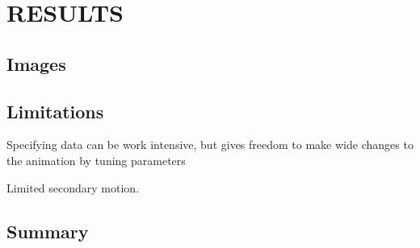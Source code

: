 
 
\chapter{RESULTS}
\label{chapter:results}

\section{Images}
\label{section:image_results}

\section{Limitations}
\label{section:limitations}
Specifying data can be work intensive, but gives freedom to make wide changes to the animation by tuning parameters

Limited secondary motion.


\section{Summary}
\label{section:results_summary}

